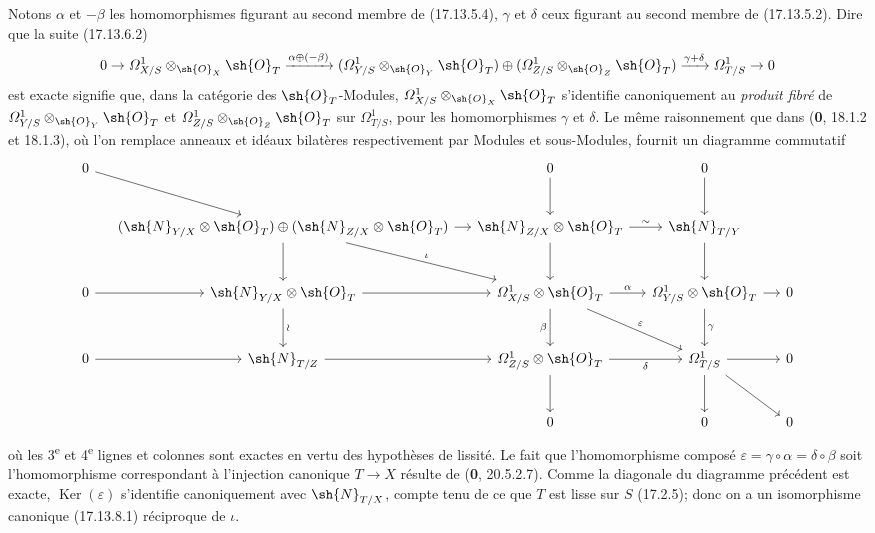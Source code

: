 Notons $\alpha$ et $-\beta$ les homomorphismes figurant au second membre de (17.13.5.4), $\gamma$ et $\delta$ ceux figurant au second membre de (17.13.5.2). Dire que la suite (17.13.6.2)
\[
0\to\varOmega^1_{X/S}\otimes_{\sh{O}_X}\sh{O}_T
\xrightarrow{\alpha\oplus(-\beta)}
(\varOmega^1_{Y/S}\otimes_{\sh{O}_Y}\sh{O}_T)\oplus
(\varOmega^1_{Z/S}\otimes_{\sh{O}_Z}\sh{O}_T)
\xrightarrow{\gamma+\delta}\varOmega^1_{T/S}\to0
\]
est exacte signifie que, dans la catégorie des $\sh{O}_T$-Modules, $\varOmega^1_{X/S}\otimes_{\sh{O}_X}\sh{O}_T$ s'identifie canoniquement au \emph{produit fibré} de $\varOmega^1_{Y/S}\otimes_{\sh{O}_Y}\sh{O}_T$ et $\varOmega^1_{Z/S}\otimes_{\sh{O}_Z}\sh{O}_T$ sur $\varOmega^1_{T/S}$, pour les homomorphismes $\gamma$ et $\delta$. Le même raisonnement que dans (\textbf{0}, 18.1.2 et 18.1.3), où l'on remplace anneaux et idéaux bilatères respectivement par Modules et sous-Modules, fournit un diagramme commutatif
{\scriptsize
\[
\begin{tikzcd}[column sep=small,row sep=large]
0 \ar[dr] & & 0 \ar[d] & 0 \ar[d] & \\
& (\sh{N}_{Y/X}\otimes\sh{O}_T)\oplus(\sh{N}_{Z/X}\otimes\sh{O}_T)
  \ar[r] \ar[d] \ar[dr,"\iota"]
& \sh{N}_{Z/X}\otimes\sh{O}_T \ar[r,"\sim"] \ar[d]
& \sh{N}_{T/Y} \ar[d] & \\
0 \ar[r] & \sh{N}_{Y/X}\otimes\sh{O}_T \ar[r] \ar[d,"\wr"]
& \varOmega^1_{X/S}\otimes\sh{O}_T \ar[r,"\alpha"] \ar[d,"\beta" swap] \ar[dr,"\varepsilon"]
& \varOmega^1_{Y/S}\otimes\sh{O}_T \ar[r] \ar[d,"\gamma"] & 0\\
0 \ar[r] & \sh{N}_{T/Z} \ar[r]
& \varOmega^1_{Z/S}\otimes\sh{O}_T \ar[r,"\delta" swap] \ar[d]
& \varOmega^1_{T/S} \ar[r] \ar[d] \ar[dr] & 0\\
& & 0 & 0 & 0
\end{tikzcd}
\]
}
où les 3\textsuperscript{e} et 4\textsuperscript{e} lignes et colonnes sont exactes en vertu des hypothèses de lissité. Le fait que l'homomorphisme composé $\varepsilon=\gamma\circ\alpha=\delta\circ\beta$ soit l'homomorphisme correspondant à l'injection canonique $T\to X$ résulte de (\textbf{0}, 20.5.2.7). Comme la diagonale du diagramme précédent est exacte, $\operatorname{Ker}(\varepsilon)$ s'identifie canoniquement avec $\sh{N}_{T/X}$, compte tenu de ce que $T$ est lisse sur $S$ (17.2.5); donc on a un isomorphisme canonique (17.13.8.1) réciproque de $\iota$.

